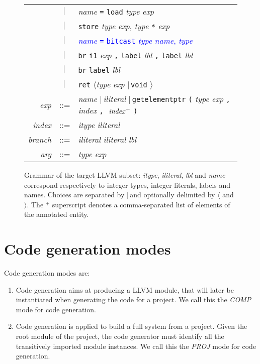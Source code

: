\documentclass{llncs}
\newcommand{\llvm}[1]{\texttt{#1}}
\newcommand{\lalt}[0]{$\langle$\xspace}
\newcommand{\ralt}[0]{$\rangle$\xspace}
\newcommand{\alt}[0]{$\mid\,$}
\newcommand{\ListOf}[1]{$\mbox{#1}^+$}
\newcommand{\nt}[1]{{\normalfont\textit{#1}}}
\begin{document}
\begin{figure}
\begin{center}
\begin{tabular}{rcl}
      & \alt & \nt{name} \llvm{=} \llvm{load} \nt{type} \nt{exp} \\
      & \alt & \llvm{store} \nt{type} \nt{exp}, \nt{type} \llvm{*} \nt{exp} \\
      & \alt & \textcolor{blue}{\nt{name} \llvm{=} \llvm{bitcast} \nt{type} \nt{name}, \nt{type} }\\
      & \alt & \llvm{br} \llvm{i1} \nt{exp} \llvm{,} \llvm{label} \nt{lbl} \llvm{,} \llvm{label} \nt{lbl} \\
      & \alt & \llvm{br} \llvm{label} \nt{lbl} \\
      & \alt & \llvm{ret} \lalt \nt{type} \nt{exp} \alt \llvm{void} \ralt \\
      \nt{exp} & ::= & \nt{name} \alt \nt{iliteral} \alt \llvm{getelementptr} \llvm{(} \nt{type} \nt{exp} \llvm{,} \nt{index} \llvm{,} \textcolor{blue}{\ListOf{ \nt{index}}}  \llvm{)} \\
      \nt{index} & ::= & \nt{itype} \nt{iliteral} \\
      \nt{branch} & ::= & \nt{iliteral} \nt{iliteral} \nt{lbl} \\
      \nt{arg} & ::= & \nt{type} \nt{exp}
    \end{tabular}
  \end{center}
  \caption{Grammar of the target LLVM subset: \nt{itype}, \nt{iliteral}, \nt{lbl}
    and \nt{name} correspond respectively to integer types, integer literals,
    labels and names. Choices are separated by \alt and optionally delimited by
    \lalt and \ralt.  The \ListOf{} superscript denotes a comma-separated list of
    elements of the annotated entity.}
  \label{fig:llvm-grammar}
\end{figure}

\section{Code generation modes}
\label{sec:overview}

Code generation modes are:
\begin{enumerate}
\item Code generation aims at producing a LLVM module,
  that will later be instantiated when generating the code for a project. We
  call this the \emph{COMP} mode for code generation.
\item Code generation is applied to build a full system from a project. Given
  the root module of the project, the code generator must identify all the
  transitively imported module instances. We call this the \emph{PROJ} mode for
  code generation.
\end{enumerate}
\end{document}
